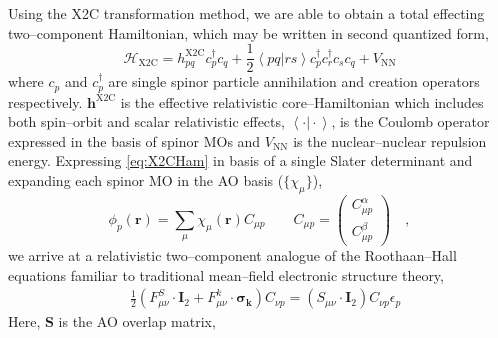 \documentclass[12pt]{article}
\newcommand{\inner}[2]{\left\langle #1 \left\vert\right. #2 \right\rangle}            %
\newcommand*\vc[1]{\boldsymbol{#1}}
\newcommand*\op[1]{\mathcal{#1}}
\begin{document}
Using the X2C transformation method, we are able to obtain a total effecting
two--component Hamiltonian, which may be written in second quantized form,
\begin{equation}
\op{H}_\mathrm{X2C} = h_{pq}^\mathrm{X2C}c_p^\dagger c_q + 
  \frac{1}{2} \inner{pq}{rs} c_p^\dagger c_r^\dagger c_s c_q + V_\mathrm{NN}
  \label{eq:X2CHam}
\end{equation}
where $c_p$ and $c_p^\dagger$ are single spinor particle annihilation and
creation operators respectively. $\vc{h}^\mathrm{X2C}$ is the effective
relativistic core--Hamiltonian which includes both spin--orbit and scalar
relativistic effects, $\inner{\cdot}{\cdot}$, is the Coulomb operator expressed
in the basis of spinor MOs and $V_\mathrm{NN}$ is the nuclear--nuclear repulsion
energy. Expressing \cref{eq:X2CHam} in basis of a single Slater determinant and
expanding each spinor MO in the AO basis ($\lbrace \chi_\mu \rbrace$),
\begin{equation}
\phi_p ( \vc{r} ) = \sum_\mu \chi_\mu(\vc{r}) C_{\mu p}
\qquad
C_{\mu p} = \begin{pmatrix}
C_{\mu p}^\alpha \\ C_{\mu p}^\beta
\end{pmatrix}
\quad , \label{eq:AO2MO}
\end{equation}
we arrive at a relativistic two--component analogue of the Roothaan--Hall
equations familiar to traditional mean--field electronic structure theory,
\begin{align}
&\frac{1}{2}\left(
  F^S_{\mu\nu} \cdot \vc{I}_2 + F^k_{\mu\nu} \cdot \vc{\sigma_k}
\right) C_{\nu p} = (S_{\mu\nu}\cdot \vc{I}_2) C_{\nu p}
\epsilon_p\label{eq:Roothaan}
\end{align}
Here, $\vc{S}$ is the AO overlap matrix, 
\end{document}

